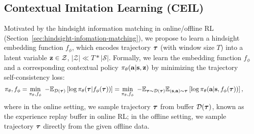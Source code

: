 
\subsection{Contextual Imitation Learning (CEIL)}
\label{sec:ceil-method}

Motivated by the hindsight information matching in online/offline RL (Section~\ref{sec:hindsight-infomation-matching}), we propose to learn a hindsight embedding function ${f_\phi}$, which encodes trajectory ${\bm{\tau}}$ (with window size $T$) into a latent variable ${\mathbf{z}} \in \mathcal{Z}$, $|\mathcal{Z}| \ll T*|\mathcal{S}|$. 
Formally, we learn the embedding function ${f_\phi}$ and a corresponding contextual policy $\pi_\theta(\mathbf{a}|\mathbf{s},{\mathbf{z}})$ by minimizing the trajectory self-consistency loss: 
\begin{align}
	\pi_\theta, f_\phi &= \min_{\pi_\theta, f_\phi} \ - \mathbb{E}_{\mathcal{D}({\bm{\tau}})} \left[ \log \pi_\theta({\bm{\tau}}|{f_\phi}({\bm{\tau}})) \right] = \min_{\pi_\theta, f_\phi} \ - \mathbb{E}_{{\bm{\tau}}\sim\mathcal{D}({\bm{\tau}})}\mathbb{E}_{(\mathbf{s},\mathbf{a})\sim{\bm{\tau}}} \left[ \log \pi_\theta(\mathbf{a}|\mathbf{s}, {f_\phi}({\bm{\tau}})) \right], \label{eq:traj-self-consistent} 
\end{align}
where in the online setting, we sample trajectory ${\bm{\tau}}$ from buffer $\mathcal{D}({\bm{\tau}})$, known as the experience replay buffer in online RL; in the offline setting, we sample trajectory ${\bm{\tau}}$ directly from the given offline data. 

